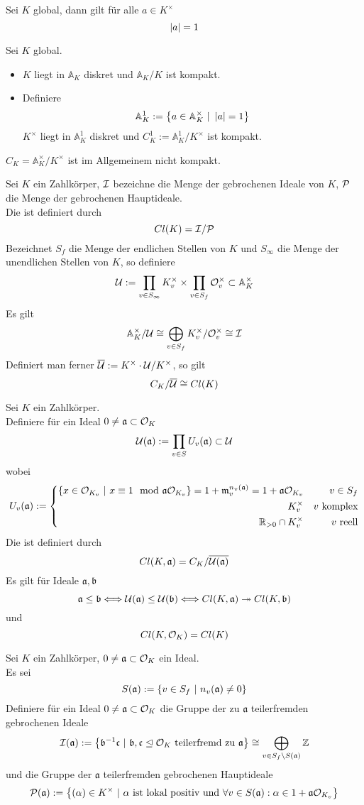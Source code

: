 \documentclass{book}
\renewcommand{\A}{\mathbb{A}}
\renewcommand{\i}{^{-1}}
\newcommand{\af}{\mathfrak{a}}
\renewcommand{\bf}{\mathfrak{b}}
\newcommand{\cf}{\mathfrak{c}}
\newcommand{\mf}{\mathfrak{m}}
\begin{document}
Sei $K$ global, dann gilt für alle $a \in K^\times$
\[ \bet{a} = 1 \]

\Satz{}
Sei $K$ global.
\begin{itemize}
\item $K$ liegt in $\A_K$ diskret und $\A_K/K$ ist kompakt.
\item Definiere
\[ \A_K^1 := \set{a\in\A_K^\times}{ \bet{a} = 1 } \]
$K^\times$ liegt in $\A_K^1$ diskret und $C^1_K:= \A_K^1/K^\times$ ist kompakt.
\end{itemize}

\Bem{}
$C_K = \A_K^\times/K^\times$ ist im Allgemeinem nicht kompakt.

Sei $K$ ein Zahlkörper, $\I$ bezeichne die Menge der gebrochenen Ideale von $K$, $\P$ die Menge der gebrochenen Hauptideale.\\
Die  ist definiert durch
\[Cl(K) = \I/\P \]
Bezeichnet $S_f$ die Menge der endlichen Stellen von $K$ und $S_\infty$ die Menge der unendlichen Stellen von $K$, so definiere
\[ \U := \prod_{v\in S_\infty}K_v^\times \times \prod_{v\in S_f} \O_v^\times \subset \A_K^\times \]
Es gilt
\[ \A_K^\times / \U \isom{} \bigoplus_{v\in S_f} K_v^\times / \O_v^\times \isom{} \I  \]
Definiert man ferner $\overline{\U} := K^\times\cdot\U/K^\times$, so gilt
\[ C_K / \overline{\U} \isom{} Cl(K) \]

Sei $K$ ein Zahlkörper.\\
Definiere für ein Ideal $0\neq \af \subset \O_K$
\[ \U(\af) := \prod_{v\in S}U_v(\af) \subset \U \]
wobei
\[ U_v(\af) := \left\lbrace
\begin{aligned}
\{x \in \O_{K_v}~|~x \equiv 1 \mod{\af\O_{K_v}}\} = 1 + \mf_v^{n_v(\af)} = 1 + \af \O_{K_v} && v \in S_f\\
K_v^\times && v \text{ komplex}\\
\R_{>0} \cap K^\times_v && v \text{ reell}
\end{aligned}
\right. \]
Die  ist definiert durch
\[Cl(K, \af) = C_K / \overline{\U(\af)} \]
Es gilt für Ideale $\af,\bf$
\[ \af \leq \bf \Gdw{} \U(\af) \leq \U(\bf) \Gdw{} Cl(K,\af) \surj{} Cl(K,\bf) \]
und
\[ Cl(K,\O_K) = Cl(K) \]

Sei $K$ ein Zahlkörper, $0\neq \af \subset \O_K$ ein Ideal.\\
Es sei
\[ S(\af) := \set{v \in S_f}{n_v(\af) \neq 0} \]
Definiere für ein Ideal $0\neq \af \subset \O_K$ die Gruppe der zu $\af$ teilerfremden gebrochenen Ideale
\[ \I(\af) := \set{\bf\i \cf}{\bf,\cf \trianglelefteq \O_K \text{ teilerfremd zu } \af} \isom{} \bigoplus_{v\in S_f \setminus S(\af)}\Z \]
und die Gruppe der $\af$ teilerfremden gebrochenen Hauptideale
\[ \P(\af) := \set{(\alpha) \in K^\times}{\alpha \text{ ist lokal positiv und }\forall v \in S(\af): \alpha \in 1 + \af\O_{K_v}}  \]
\end{document}

